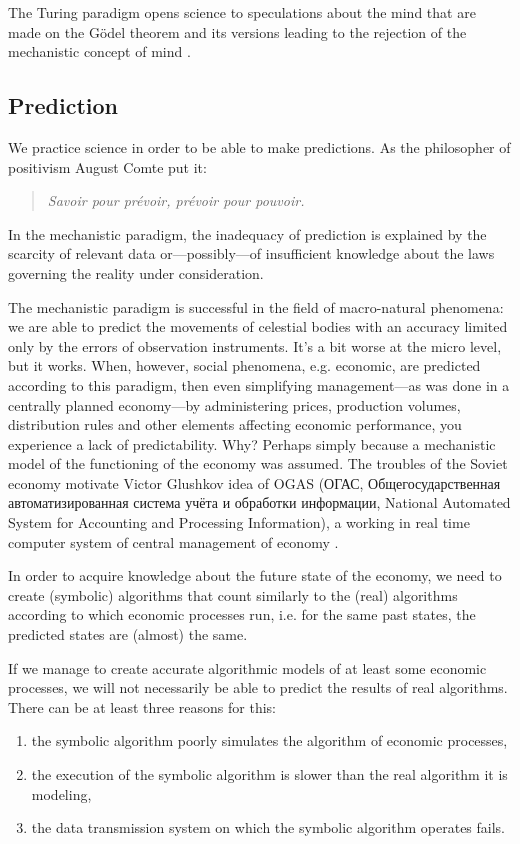 \documentclass[pdftex,12pt]{article}
\begin{document}
The Turing paradigm opens science to speculations about the mind that are made on the G{\"o}del theorem and its versions leading to the rejection of the mechanistic concept of mind \parencite{Krajewski2020}.


\subsection{Prediction} 
We practice science in order to be able to make predictions. As the philosopher of positivism August Comte put it: \begin{quote} \small \textit{Savoir pour pr{\'e}voir, pr{\'e}voir pour pouvoir.}  \end{quote} In the mechanistic paradigm, the inadequacy of prediction is explained by the scarcity of relevant data or---possibly---of insufficient knowledge about the laws governing the reality under consideration.

The mechanistic paradigm is successful in the field of macro-natural phenomena: we are able to predict the movements of celestial bodies with an accuracy limited only by the errors of observation instruments. It's a bit worse at the micro level, but it works. When, however, social phenomena, e.g. economic, are predicted according to this paradigm, then even simplifying management---as was done in a centrally planned economy---by administering prices, production volumes, distribution rules and other elements affecting economic performance, you experience a lack of predictability. Why? Perhaps simply because a mechanistic model of the functioning of the economy was assumed. The troubles of the Soviet economy motivate Victor Glushkov idea of  OGAS (\foreignlanguage{russian}{ОГАС}, \foreignlanguage{russian}{Общегосударственная автоматизированная система учёта и обработки информации}, National Automated System for Accounting and Processing Information), a working in real time computer system  of central management of  economy
\parencite{glushkov_chto_2004}.

In order to acquire knowledge about the future state of the economy, we need to create (symbolic) algorithms that count similarly to the (real) algorithms according to which economic processes run, i.e. for the same past states, the predicted states are (almost) the same.

If we manage to create accurate algorithmic models of at least some economic processes, we will not necessarily be able to predict the results of real algorithms. There can be at least three reasons for this: \begin{enumerate}
\item the symbolic algorithm poorly simulates the algorithm of economic processes,
\item the execution of the symbolic algorithm is slower than the real algorithm it is modeling,
\item the data transmission system on which the symbolic algorithm operates fails.
\end{enumerate}
\end{document}
